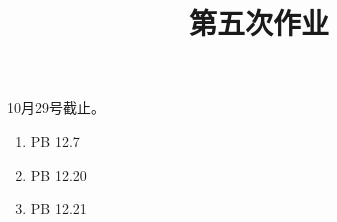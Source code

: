\documentclass[12pt,aps,pra,notitlepage]{revtex4-1}
\begin{document}
\title{第五次作业}
\maketitle
\begin{center}
  10月29号截止。
\end{center}
\begin{enumerate}
  \item PB 12.7
  \item PB 12.20
  \item PB 12.21
\end{enumerate}
\end{document}
